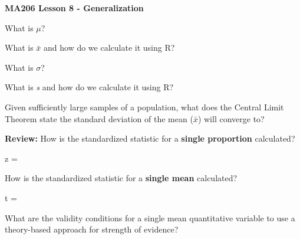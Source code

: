 \documentclass{article}
\newif\ifPrintSolution
\newcommand{\sol}[1]{\ifPrintSolution {\color{blue} #1 } \fi}
\begin{document}
\noindent \textbf{MA206 Lesson 8 - Generalization}
\vspace{.1in}

What is $\mu$?

\sol{ $\mu$ indicates the population mean, it is a parameter.}

\vfill

What is $\bar{x}$ and how do we calculate it using R?

\sol{$\bar{x}$ is the sample mean, the statistic observed from quantitative data.\\
We find it using the command \color{blue} mean(data) \color{black} }


\vfill

What is $\sigma$?

\sol{ $\sigma$ indicates the population standard deviation, it is a parameter.}

\vfill

What is \textit{s} and how do we calculate it using R?

\sol{\textit{s} is the sample standard deviation, the statistic observed from quantitative data.\\
We find it using the comand \color{blue} sd(data) \color{black}}


\vfill

Given sufficiently large samples of a population, what does the Central Limit Theorem state the standard deviation of the mean ($\bar{x}$) will converge to?

\sol{SD($\bar{x}$) = $\frac{\sigma}{\sqrt{n}}$, where we can estimate $\sigma$ with \textit{s}}

\vfill

\textbf{Review:} How is the standardized statistic for a \textbf{single proportion} calculated?

z = \sol{$ \frac{\hat{p} - \pi}{\sqrt{\frac{\pi (1 - \pi)}{n}}}$}

\vfill

How is the standardized statistic for a \textbf{single mean} calculated?

t = \sol{$ \frac{\bar{x} - \mu}{\frac{s}{\sqrt{{n}}}}$}

\vfill

What are the validity conditions for a single mean quantitative variable to use a theory-based approach for strength of evidence?

\sol{The distribution must be symmetric \textbf{OR} must have at least 20 observations and not be heavily skewed}
\end{document}
